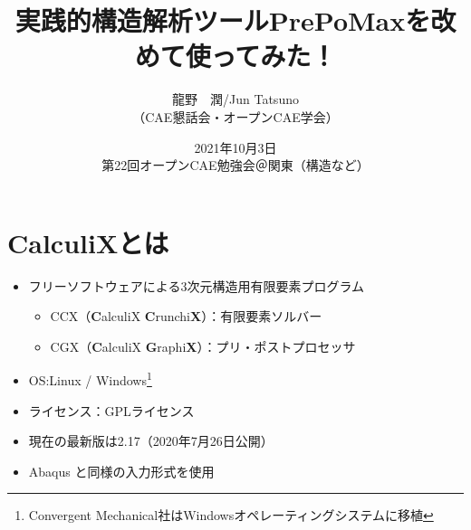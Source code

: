 \documentclass[a4j,20pt,slide]{ltjsarticle}
\title{実践的構造解析ツールPrePoMaxを改めて使ってみた！}
\author{龍野　潤/Jun Tatsuno\\（CAE懇話会・オープンCAE学会）}
\date{2021年10月3日\\第22回オープンCAE勉強会＠関東（構造など）}
\begin{document}
\maketitle
%
\tableofcontents
%
\section{CalculiXとは}
\begin{itemize}
	\item フリーソフトウェアによる3次元構造用有限要素プログラム
	      \begin{itemize}
		      \item CCX（\textbf{C}alculiX \textbf{C}runchi\textbf{X}）：有限要素ソルバー
		      \item CGX（\textbf{C}alculiX \textbf{G}raphi\textbf{X}）：プリ・ポストプロセッサ
	      \end{itemize}
	\item OS:Linux / Windows\footnote{Convergent Mechanical社はWindowsオペレーティングシステムに移植}
	\item ライセンス：GPLライセンス
	\item 現在の最新版は2.17（2020年7月26日公開）
	\item Abaqus と同様の入力形式を使用
\end{itemize}
\vspace{-\baselineskip}
\end{document}
